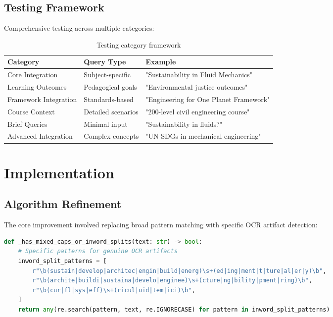 \documentclass[12pt,a4paper]{article}
\begin{document}
\subsection{Testing Framework}
Comprehensive testing across multiple categories:

\begin{table}[H]
\centering
\begin{tabular}{@{}lll@{}}
\toprule
\textbf{Category} & \textbf{Query Type} & \textbf{Example} \\
\midrule
Core Integration & Subject-specific & "Sustainability in Fluid Mechanics" \\
Learning Outcomes & Pedagogical goals & "Environmental justice outcomes" \\
Framework Integration & Standards-based & "Engineering for One Planet Framework" \\
Course Context & Detailed scenarios & "200-level civil engineering course" \\
Brief Queries & Minimal input & "Sustainability in fluids?" \\
Advanced Integration & Complex concepts & "UN SDGs in mechanical engineering" \\
\bottomrule
\end{tabular}
\caption{Testing category framework}
\end{table}

\section{Implementation}

\subsection{Algorithm Refinement}
The core improvement involved replacing broad pattern matching with specific OCR artifact detection:

\begin{lstlisting}[language=Python, caption=Refined surface artifact detection]
def _has_mixed_caps_or_inword_splits(text: str) -> bool:
    # Specific patterns for genuine OCR artifacts
    inword_split_patterns = [
        r"\b(sustain|develop|architec|engin|build|energ)\s+(ed|ing|ment|t|ture|al|er|y)\b",
        r"\b(archite|buildi|sustaina|develo|enginee)\s+(cture|ng|bility|pment|ring)\b",
        r"\b(cur|fl|sys|eff)\s+(ricul|uid|tem|ici)\b",
    ]
    return any(re.search(pattern, text, re.IGNORECASE) for pattern in inword_split_patterns)
\end{lstlisting}
\end{document}
